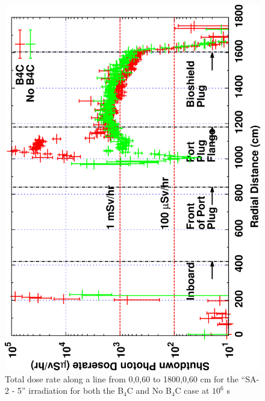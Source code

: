 \documentclass[12pt]{article}
\begin{document}
\begin{figure}[ht!]
\centering
\includegraphics[clip,scale=0.12,angle=-90]{../plots/photon_lineout/comp/10yr_dc2.png}
\caption{Total dose rate along a line from 0,0,60 to 1800,0,60 cm for the ``SA-2 - 5'' irradiation
for both the B$_4$C and No B$_4$C case at $10^6$ s}
\label{fig:photons_10y_dc2_dose}
\end{figure}
\newpage
\end{document}
